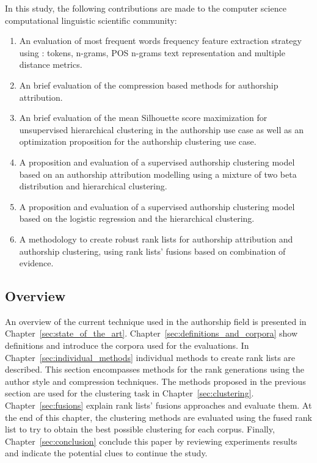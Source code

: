 In this study, the following contributions are made to the computer science computational linguistic scientific community:

\begin{enumerate}
  \item
  An evaluation of most frequent words frequency feature extraction strategy using : tokens, n-grams, POS n-grams text representation and multiple distance metrics.
  \item
  An brief evaluation of the compression based methods for authorship attribution.
  \item
  An brief evaluation of the mean Silhouette score maximization for unsupervised hierarchical clustering in the authorship use case as well as an optimization proposition for the authorship clustering use case.
  \item
  A proposition and evaluation of a supervised authorship clustering model based on an authorship attribution modelling using a mixture of two beta distribution and hierarchical clustering.
  \item
  A proposition and evaluation of a supervised authorship clustering model based on the logistic regression and the hierarchical clustering.
  \item
  A methodology to create robust rank lists for authorship attribution and authorship clustering, using rank lists' fusions based on combination of evidence.
\end{enumerate}

\subsection{Overview}

An overview of the current technique used in the authorship field is presented in Chapter~\ref{sec:state_of_the_art}.
Chapter~\ref{sec:definitions_and_corpora} show definitions and introduce the corpora used for the evaluations.
In Chapter~\ref{sec:individual_methods} individual methods to create rank lists are described.
This section encompasses methods for the rank generations using the author style and compression techniques.
The methods proposed in the previous section are used for the clustering task in Chapter~\ref{sec:clustering}.
Chapter~\ref{sec:fusions} explain rank lists' fusions approaches and evaluate them.
At the end of this chapter, the clustering methods are evaluated using the fused rank list to try to obtain the best possible clustering for each corpus.
Finally, Chapter~\ref{sec:conclusion} conclude this paper by reviewing experiments results and indicate the potential clues to continue the study.

